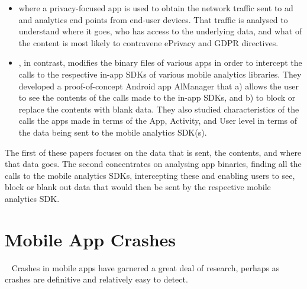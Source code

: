 \begin{itemize}
        \item \textcite{razaghpanah2018_apps_trackers_privacy_and_regulators_a_global_study_of_the_mobile_tracking_ecosystem} where a privacy-focused app is used to obtain the network traffic sent to ad and analytics end points from end-user devices. That traffic is analysed to understand where it goes, who has access to the underlying data, and what of the content is most likely to contravene ePrivacy and GDPR directives.
        \item \textcite{liu2020_privacy_risk_analysis_and_mitigation_of_analytics_libraries_in_the_android_ecosystem}, in contrast, modifies the binary files of various apps in order to intercept the calls to the respective in-app SDKs of various mobile analytics libraries. They developed a proof-of-concept Android app AlManager that a) allows the user to see the contents of the calls made to the in-app SDKs, and b) to block or replace the contents with blank data. They also studied characteristics of the calls the apps made in terms of the App, Activity, and User level in terms of the data being sent to the mobile analytics SDK(s).
\end{itemize}

The first of these papers focuses on the data that is sent, the contents, and where that data goes. The second concentrates on analysing app binaries, finding all the calls to the mobile analytics SDKs, intercepting these and enabling users to see, block or blank out data that would then be sent by the respective mobile analytics SDK.


\section{Mobile App Crashes}~\label{rw-mobile-app-crashes-topic}
Crashes in mobile apps have garnered a great deal of research, perhaps as crashes are definitive and relatively easy to detect.

